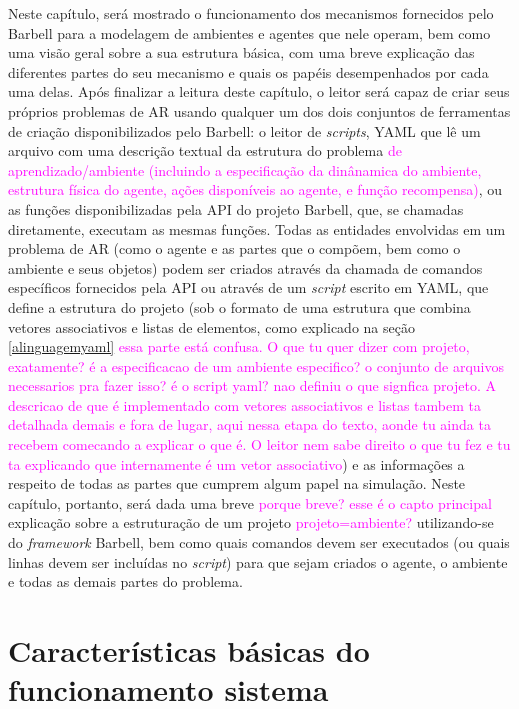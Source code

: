 \documentclass[cic,tc]{iiufrgs}
\newcommand\bruno[1]{\textcolor{magenta}{#1}}
\begin{document}
Neste capítulo, será mostrado o funcionamento dos mecanismos fornecidos pelo Barbell para a modelagem de ambientes e agentes que nele operam, bem como uma
visão geral sobre a sua estrutura básica, com uma breve explicação das diferentes partes do seu mecanismo e quais os papéis desempenhados por cada uma delas. Após
finalizar a leitura deste capítulo, o leitor será capaz de criar seus próprios problemas de AR usando qualquer um dos dois conjuntos de ferramentas de criação
disponibilizados pelo Barbell: o leitor de \textit{scripts}, YAML que lê um arquivo com uma descrição textual da estrutura do problema \bruno{de aprendizado/ambiente (incluindo a especificação da dinânamica do ambiente, estrutura física do agente, ações disponíveis ao agente, e função recompensa)}, ou as funções
disponibilizadas pela API do projeto Barbell, que, se chamadas diretamente, executam as mesmas funções.
Todas as entidades envolvidas em um problema de AR (como o agente e as partes que o compõem, bem como o ambiente e seus objetos) podem ser criados através
da chamada de comandos específicos fornecidos pela API ou através de um \textit{script} escrito em YAML, que define a estrutura do projeto (sob o formato
de uma estrutura que combina vetores associativos e listas de elementos, como explicado na seção \ref{alinguagemyaml} \bruno{essa parte está confusa. O que tu quer dizer com projeto, exatamente? é a especificacao de um ambiente especifico? o conjunto de arquivos necessarios pra fazer isso? é o script yaml? nao definiu o que signfica projeto. A descricao de que é implementado com vetores associativos e listas tambem ta detalhada demais e fora de lugar, aqui nessa etapa do texto, aonde tu ainda ta recebem comecando a explicar o que é. O leitor nem sabe direito o que tu fez e tu ta explicando que internamente é um vetor associativo}) e as informações
a respeito de todas as partes que cumprem algum papel na simulação. Neste capítulo, portanto, será dada uma breve \bruno{porque breve? esse é o capto principal} explicação sobre a estruturação de um projeto \bruno{projeto=ambiente?}
utilizando-se do \textit{framework} Barbell, bem como quais comandos devem ser executados (ou quais linhas devem ser incluídas no \textit{script}) para que sejam criados
o agente, o ambiente e todas as demais partes do problema.
\section{Características básicas do funcionamento sistema}
\end{document}
